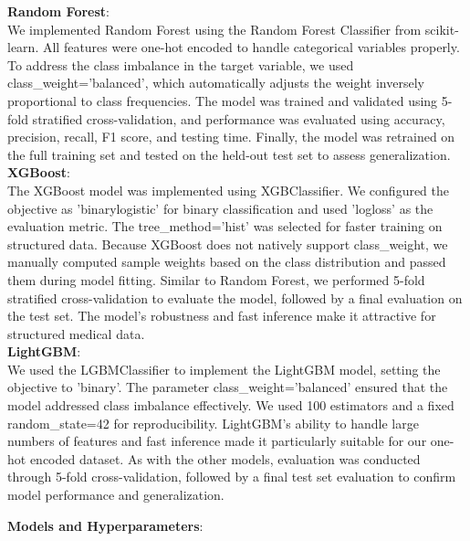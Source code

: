 \documentclass[conference]{IEEEtran}
\begin{document}
\noindent
\textbf{Random Forest}:\\
We implemented Random Forest using the Random Forest Classifier from scikit-learn. All features were one-hot encoded to handle categorical variables properly. To address the class imbalance in the target variable, we used class\_weight='balanced', which automatically adjusts the weight inversely proportional to class frequencies. The model was trained and validated using 5-fold stratified cross-validation, and performance was evaluated using accuracy, precision, recall, F1 score, and testing time. Finally, the model was retrained on the full training set and tested on the held-out test set to assess generalization.\\

\noindent
\textbf{XGBoost}:\\
The XGBoost model was implemented using XGBClassifier. We configured the objective as 'binary\:logistic' for binary classification and used 'logloss' as the evaluation metric. The tree\_method='hist' was selected for faster training on structured data. Because XGBoost does not natively support class\_weight, we manually computed sample weights based on the class distribution and passed them during model fitting. Similar to Random Forest, we performed 5-fold stratified cross-validation to evaluate the model, followed by a final evaluation on the test set. The model's robustness and fast inference make it attractive for structured medical data.\\

\noindent
\textbf{LightGBM}:\\
We used the LGBMClassifier to implement the LightGBM model, setting the objective to 'binary'. The parameter class\_weight='balanced' ensured that the model addressed class imbalance effectively. We used 100 estimators and a fixed random\_state=42 for reproducibility. LightGBM’s ability to handle large numbers of features and fast inference made it particularly suitable for our one-hot encoded dataset. As with the other models, evaluation was conducted through 5-fold cross-validation, followed by a final test set evaluation to confirm model performance and generalization.

\vspace{1em}

\textbf{Models and Hyperparameters}:

\vspace{-10px}
\end{document}
